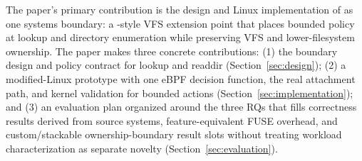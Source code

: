 The paper's primary contribution is the design and Linux implementation of
\namei as one systems boundary: a -style VFS extension point
that places bounded policy at lookup and directory enumeration while preserving
VFS and lower-filesystem ownership. The paper makes three concrete
contributions: (1) the boundary design and policy contract for lookup and
readdir (Section~\ref{sec:design}); (2) a modified-Linux prototype with one
eBPF decision function, the real  attachment path, and
kernel validation for bounded actions (Section~\ref{sec:implementation}); and
(3) an evaluation plan organized around the three RQs that fills correctness
results derived from source systems, feature-equivalent FUSE overhead, and
custom/stackable ownership-boundary result slots without treating workload
characterization as separate novelty (Section~\ref{sec:evaluation}).
